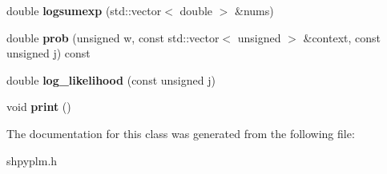 \begin{DoxyCompactItemize}
\item 
\mbox{\label{classcpyp_1_1_s_p_y_p_l_m_abf4ffcf23da3b5ade1fc70351099b15e}} 
double {\bfseries logsumexp} (std\+::vector$<$ double $>$ \&nums)
\item 
\mbox{\label{classcpyp_1_1_s_p_y_p_l_m_ad6c2cd1b003d6e655449c28308d5d830}} 
double {\bfseries prob} (unsigned w, const std\+::vector$<$ unsigned $>$ \&context, const unsigned j) const
\item 
\mbox{\label{classcpyp_1_1_s_p_y_p_l_m_aba3967b8514bb07eced3ee2977916cb4}} 
double {\bfseries log\+\_\+likelihood} (const unsigned j)
\item 
\mbox{\label{classcpyp_1_1_s_p_y_p_l_m_a85178a9a55b701b64d62acb74527fc87}} 
void {\bfseries print} ()
\end{DoxyCompactItemize}


The documentation for this class was generated from the following file\+:\begin{DoxyCompactItemize}
\item 
shpyplm.\+h\end{DoxyCompactItemize}

